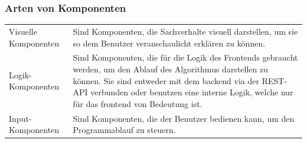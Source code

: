 \documentclass[a4paper,10.2pt,pdftex]{scrartcl}%
\begin{document}
\subsubsection{Arten von Komponenten}
\begin{tabularx}{\textwidth}{p{3cm}p{11cm}} 
Visuelle Komponenten &  Sind Komponenten, die Sachverhalte visuell darstellen, um sie so dem Benutzer veranschaulicht erklären zu können. \\
Logik-Komponenten & Sind Komponenten, die für die Logik des Frontends gebraucht werden, um den Ablauf des Algorithmus darstellen zu können. Sie sind entweder mit dem backend via der REST-API verbunden oder benutzen eine interne Logik, welche nur für das frontend von Bedeutung ist. \\
Input-Komponenten & Sind Komponenten, die der Benutzer bedienen kann, um den Programmablauf zu steuern.
\end{tabularx}
\end{document}
